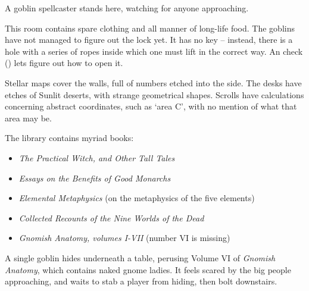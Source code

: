 \begin{multicols}{2}

A goblin spellcaster stands here, watching for anyone approaching.

\goblincaster

\showStdSpells


This room contains spare clothing and all manner of long-life food.
The goblins have not managed to figure out the lock yet.
It has no key -- instead, there is a hole with a series of ropes inside which one must lift in the correct way.
An  check (\tn[10]) lets  figure out how to open it.


\begin{boxtext}

  Stellar maps cover the walls, full of numbers etched into the side.
  The desks have etches of Sunlit deserts, with strange geometrical shapes.
  Scrolls have calculations concerning abstract coordinates, such as `area C', with no mention of what that area may be.

\end{boxtext}


The library contains myriad books:

\begin{itemize}
  \item
  \textit{The Practical Witch, and Other Tall Tales}
  \item
  \textit{Essays on the Benefits of Good Monarchs}
  \item
  \textit{Elemental Metaphysics}
  (on the metaphysics of the five elements)
  \item
  \textit{Collected Recounts of the Nine Worlds of the Dead}
  \item
  \textit{Gnomish Anatomy, volumes I-VII}
  (number VI is missing)
\end{itemize}

\noindent
A single goblin hides underneath a table, perusing Volume VI of \textit{Gnomish Anatomy}, which contains naked gnome ladies.
It feels scared by the big people approaching, and waits to stab a player from hiding, then bolt downstairs.


\end{multicols}
